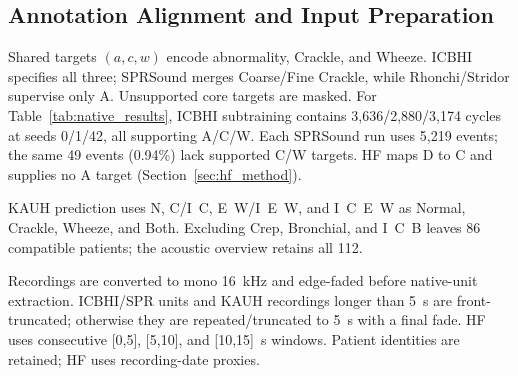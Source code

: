 \subsection{Annotation Alignment and Input Preparation}
\label{sec:annotation_alignment}
Shared targets $(a,c,w)$ encode abnormality, Crackle, and Wheeze.
ICBHI specifies all three; SPRSound merges Coarse/Fine Crackle, while
Rhonchi/Stridor supervise only A. Unsupported core targets are masked.
For Table~\ref{tab:native_results}, ICBHI subtraining contains
3,636/2,880/3,174 cycles at seeds 0/1/42, all supporting A/C/W.
Each SPRSound run uses 5,219 events; the same 49 events (0.94\%) lack
supported C/W targets. HF maps D to C and supplies no A target
(Section~\ref{sec:hf_method}).

KAUH prediction uses N, C/I~C, E~W/I~E~W, and I~C~E~W as Normal,
Crackle, Wheeze, and Both. Excluding Crep, Bronchial, and I~C~B leaves
86 compatible patients; the acoustic overview retains all 112.

Recordings are converted to mono 16~kHz and edge-faded before native-unit
extraction. ICBHI/SPR units and KAUH recordings longer than 5~s are
front-truncated; otherwise they are repeated/truncated to 5~s with a final
fade. HF uses consecutive [0,5], [5,10], and [10,15]~s windows.
Patient identities are retained; HF uses recording-date proxies.
